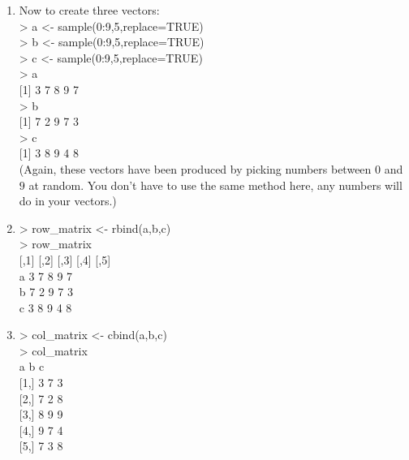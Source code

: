 \documentclass[
]{book}
\begin{document}
\begin{enumerate}
  \textgreater{} matrix\_char \textless- matrix(char\_vect,3,4)\\
  \textgreater{} matrix\_char\\
  {[},1{]} {[},2{]} {[},3{]} {[},4{]}\\
  {[}1,{]} ``d'' ``d'' ``d'' ``b'' \\
  {[}2,{]} ``a'' ``b'' ``f'' ``f'' \\
  {[}3,{]} ``g'' ``f'' ``f'' ``i'' \\
  Alternatively, you can pick the character strings for your matrix by hand:
  char\_vect \textless- c(``first word'', ``second word'', \ldots)
\item
  Now to create three vectors:\\
  \textgreater{} a \textless- sample(0:9,5,replace=TRUE)\\
  \textgreater{} b \textless- sample(0:9,5,replace=TRUE)\\
  \textgreater{} c \textless- sample(0:9,5,replace=TRUE)\\
  \textgreater{} a\\
  {[}1{]} 3 7 8 9 7\\
  \textgreater{} b\\
  {[}1{]} 7 2 9 7 3\\
  \textgreater{} c\\
  {[}1{]} 3 8 9 4 8\\
  (Again, these vectors have been produced by picking numbers between \(0\) and \(9\) at random. You don't have to use the same method here, any numbers will do in your vectors.)
\item
  \textgreater{} row\_matrix \textless- rbind(a,b,c)\\
  \textgreater{} row\_matrix\\
  {[},1{]} {[},2{]} {[},3{]} {[},4{]} {[},5{]}\\
  a 3 7 8 9 7\\
  b 7 2 9 7 3\\
  c 3 8 9 4 8
\item
  \textgreater{} col\_matrix \textless- cbind(a,b,c)\\
  \textgreater{} col\_matrix\\
  a b c\\
  {[}1,{]} 3 7 3\\
  {[}2,{]} 7 2 8\\
  {[}3,{]} 8 9 9\\
  {[}4,{]} 9 7 4\\
  {[}5,{]} 7 3 8
\end{enumerate}
\end{document}
